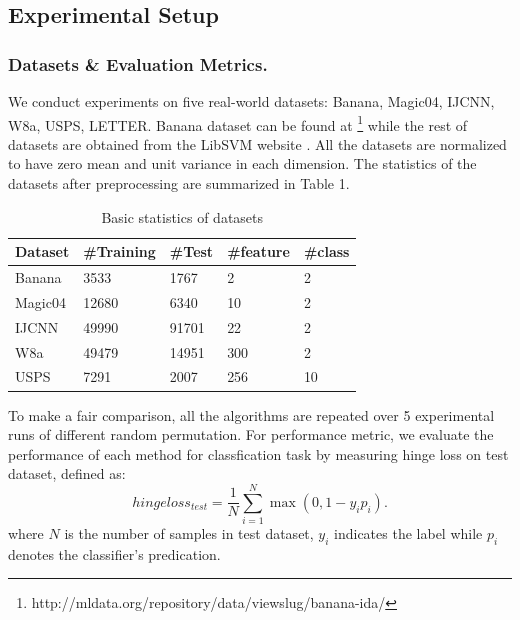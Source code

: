 \documentclass{llncs}
\begin{document}
	\subsection{Experimental Setup}
	\subsubsection{Datasets \& Evaluation Metrics.}
	We conduct experiments on five real-world datasets: Banana, Magic04, IJCNN, W8a, USPS, LETTER. Banana dataset can be found at \footnote{http://mldata.org/repository/data/viewslug/banana-ida/} while the rest of datasets are obtained from the LibSVM website \cite{15}.  All the datasets are normalized to have zero mean and unit variance in each dimension. The statistics of the datasets after preprocessing are summarized in Table 1.
	\begin{table}
		\centering
		\begin{tabu} to \textwidth {|X[c]| X[c]| X[c]| X[c]| X[c]|}
			\hline
			Dataset              & \#Training & \#Test & \#feature &\#class\\
			\hline
			Banana 		   	& 3533 & 1767 & 2 & 2  \\
			Magic04     	& 12680 & 6340 & 10 & 2  \\
			IJCNN           	& 49990 & 91701 & 22 & 2  \\
			W8a           	& 49479 & 14951 & 300 & 2  \\
			USPS			& 7291 & 2007 & 256 & 10  \\
			\hline
		\end{tabu}
		\caption{Basic statistics of datasets}
	\end{table}
	To make a fair comparison, all the algorithms are repeated over 5 experimental runs of different random permutation. For performance metric, we evaluate the performance of each method for classfication task by measuring hinge loss on test dataset, defined as:
	\begin{equation*}
	hingeloss_{test} = \frac{1}{N}\sum_{i=1}^N\max(0,1-y_ip_i).
	\end{equation*}
	where $N$ is the number of samples in test dataset, $y_i$ indicates the label while $p_i$ denotes the classifier's predication.
\end{document}
